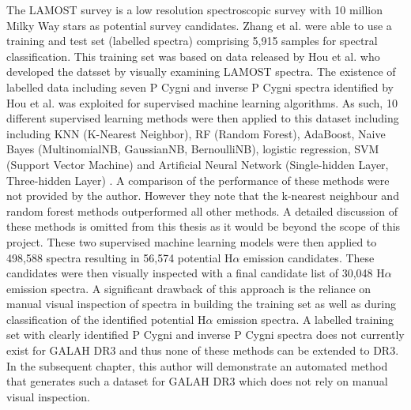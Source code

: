 The LAMOST survey is a low resolution spectroscopic survey with 10 million Milky Way stars as potential survey candidates. Zhang et al. were able to use a training and test set (labelled spectra) comprising 5,915 samples for spectral classification. This training set was based on data released by Hou et al. \cite{hou2016catalog} who developed the datsset by visually examining LAMOST spectra. The existence of labelled data including seven P Cygni and inverse P Cygni spectra identified by Hou et al. was exploited for supervised machine learning algorithms. As such, 10 different supervised learning methods were then applied to this dataset including including KNN (K-Nearest Neighbor), RF (Random Forest), AdaBoost, Naive Bayes (MultinomialNB, GaussianNB, BernoulliNB), logistic regression, SVM (Support Vector Machine) and Artificial Neural Network (Single-hidden Layer, Three-hidden Layer) \cite{zhang2021catalog}. A comparison of the performance of these methods were not provided by the author. However they note that the k-nearest neighbour and random forest methods outperformed all other methods. A detailed discussion of these methods is omitted from this thesis as it would be beyond the scope of this project. These two supervised machine learning models were then applied to 498,588 spectra resulting in 56,574 potential H$\alpha$ emission candidates. These candidates were then visually inspected with a final candidate list of 30,048 H$\alpha$ emission spectra. A significant drawback of this approach is the reliance on manual visual inspection of spectra in building the training set as well as during classification of the identified potential H$\alpha$ emission spectra. A labelled training set with clearly identified P Cygni and inverse P Cygni spectra does not currently exist for GALAH DR3 and thus none of these methods can be extended to DR3. In the subsequent chapter, this author will demonstrate an automated method that generates such a dataset for GALAH DR3 which does not rely on manual visual inspection.





